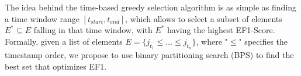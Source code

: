 The idea behind the time-based greedy selection algorithm is as simple as finding a time window range $[t_{start},t_{end}]$, which allows to select a subset of elements $E^{*}\subseteq E$ falling in that time window, with $E^{*}$ having the highest EF1-Score. 
Formally, given a list of elements $E=\{j_{t_1}\leq \dots \leq j_{t_n}\}$, where "$\leq$" specifies the timestamp order, we propose to use binary partitioning search (BPS) to find the best set that optimizes EF1.  %



